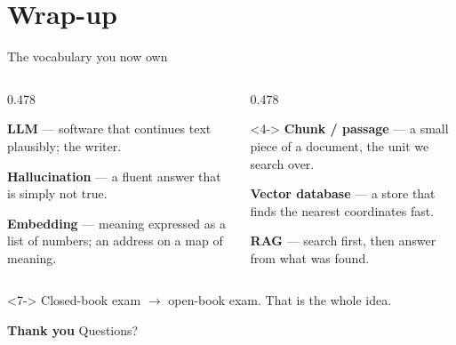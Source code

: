 \documentclass[aspectratio=169,11pt]{beamer}
\begin{document}
\section{Wrap-up}

\begin{frame}{The vocabulary you now own}
  \begin{columns}[T,onlytextwidth]
    \begin{column}{0.478\textwidth}
      \begin{block}{}
        \small
        \textbf{LLM} --- software that continues text plausibly; the writer.
        \medskip

        \textbf{Hallucination} --- a fluent answer that is simply not true.
        \medskip

        \textbf{Embedding} --- meaning expressed as a list of numbers; an
        address on a map of meaning.
      \end{block}
    \end{column}
    \begin{column}{0.478\textwidth}
      \begin{block}<4->{}
        \small
        \textbf{Chunk / passage} --- a small piece of a document, the unit we
        search over.
        \medskip

        \textbf{Vector database} --- a store that finds the nearest
        coordinates fast.
        \medskip

        \textbf{RAG} --- search first, then answer from what was found.
      \end{block}
    \end{column}
  \end{columns}
  \medskip
  \begin{exampleblock}<7->{}
    \centering
    Closed-book exam $\rightarrow$ open-book exam. That is the whole idea.
  \end{exampleblock}
\end{frame}

\begin{frame}[plain]
  \transfade
  \vfill
  \centering
  {\Huge\bfseries\color{ragblue} Thank you}
  \vskip 8mm
  {\large Questions?}
  \vskip 12mm
  \vfill
\end{frame}
\end{document}
